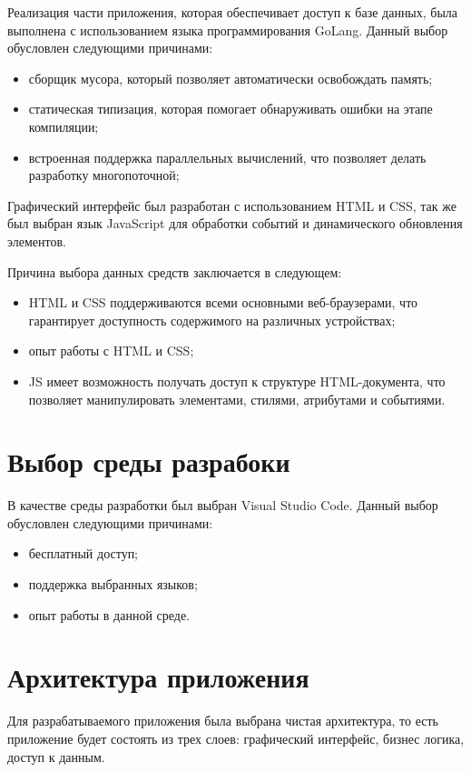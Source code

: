 Реализация части приложения,
которая обеспечивает доступ к базе данных, 
была выполнена с использованием языка программирования GoLang. 
Данный выбор обусловлен следующими причинами:

\begin{itemize}
    \item сборщик мусора, который позволяет автоматически
    освобождать память;
    \item статическая типизация, которая помогает 
    обнаруживать ошибки на этапе компиляции;
    \item встроенная поддержка параллельных вычислений, что
    позволяет делать разработку многопоточной;
\end{itemize}

Графический интерфейс был разработан с использованием HTML и CSS,
так же был выбран язык JavaScript для 
обработки событий и динамического обновления элементов.

Причина выбора данных средств заключается в следующем:
\begin{itemize}
    \item HTML и CSS поддерживаются всеми основными веб-браузерами, 
    что гарантирует доступность содержимого на различных устройствах;
    \item опыт работы с HTML и CSS;
    \item JS имеет возможность получать доступ к структуре HTML-документа, 
    что позволяет манипулировать элементами, стилями, атрибутами и событиями.
\end{itemize}

\section{Выбор среды разрабоки}

В качестве среды разработки был выбран Visual Studio Code. Данный выбор обусловлен
следующими причинами:
\begin{itemize}
    \item бесплатный доступ;
    \item поддержка выбранных языков;
    \item опыт работы в данной среде.
\end{itemize}

\section{Архитектура приложения}

Для разрабатываемого приложения была выбрана чистая архитектура, то есть приложение будет 
состоять из трех слоев: графический интерфейс, бизнес логика, доступ к данным.

